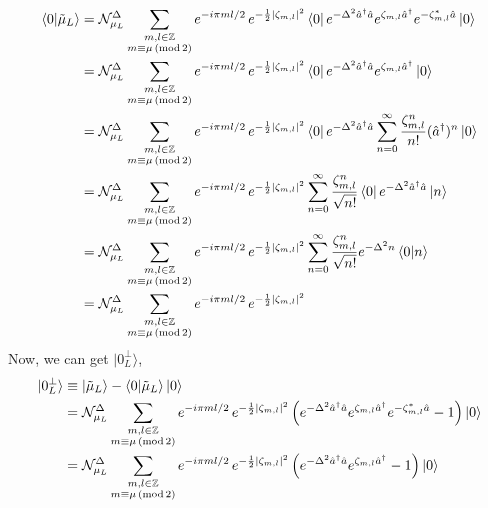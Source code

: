\documentclass[11pt]{article}
\begin{document}
\begin{align*}
    \braket{0}{\tilde{\mu}_L} & = \mathcal{N}_{\mu_L}^{\Delta} \sum_{\substack{m, l \in \mathbb{Z} \\ m \equiv \mu \,(\mathrm{mod}\, 2)}} e^{-i \pi m l / 2} \, e^{-\frac{1}{2} \abs{\zeta_{m,l}}^2} \bra{0} e^{-\Delta^2 \hat{a}^\dagger \hat{a}} e^{\zeta_{m,l}\hat{a}^\dagger} e^{- \zeta_{m,l}^* \hat{a}} \ket{0} \\
                              & = \mathcal{N}_{\mu_L}^{\Delta} \sum_{\substack{m, l \in \mathbb{Z} \\ m \equiv \mu \,(\mathrm{mod}\, 2)}} e^{-i \pi m l / 2} \, e^{-\frac{1}{2} \abs{\zeta_{m,l}}^2} \bra{0} e^{-\Delta^2 \hat{a}^\dagger \hat{a}} e^{\zeta_{m,l}\hat{a}^\dagger} \ket{0} \\
                              & = \mathcal{N}_{\mu_L}^{\Delta} \sum_{\substack{m, l \in \mathbb{Z} \\ m \equiv \mu \,(\mathrm{mod}\, 2)}} e^{-i \pi m l / 2} \, e^{-\frac{1}{2} \abs{\zeta_{m,l}}^2} \bra{0} e^{-\Delta^2 \hat{a}^\dagger \hat{a}} \sum_{n=0}^{\infty} \frac{\zeta_{m,l}^n}{n!} (\hat{a}^{\dagger})^n \ket{0} \\
                              & = \mathcal{N}_{\mu_L}^{\Delta} \sum_{\substack{m, l \in \mathbb{Z} \\ m \equiv \mu \,(\mathrm{mod}\, 2)}} e^{-i \pi m l / 2} \, e^{-\frac{1}{2} \abs{\zeta_{m,l}}^2} \sum_{n=0}^{\infty} \frac{\zeta_{m,l}^n}{\sqrt{n!}} \bra{0} e^{-\Delta^2 \hat{a}^\dagger \hat{a}} \ket{n} \\
                              & = \mathcal{N}_{\mu_L}^{\Delta} \sum_{\substack{m, l \in \mathbb{Z} \\ m \equiv \mu \,(\mathrm{mod}\, 2)}} e^{-i \pi m l / 2} \, e^{-\frac{1}{2} \abs{\zeta_{m,l}}^2} \sum_{n=0}^{\infty} \frac{\zeta_{m,l}^n}{\sqrt{n!}} e^{-\Delta^2 n} \braket{0}{n} \\
                              & = \mathcal{N}_{\mu_L}^{\Delta} \sum_{\substack{m, l \in \mathbb{Z} \\ m \equiv \mu \,(\mathrm{mod}\, 2)}} e^{-i \pi m l / 2} \, e^{-\frac{1}{2} \abs{\zeta_{m,l}}^2}
\end{align*}
Now, we can get $|0^{\perp}_L\rangle$,
\begin{align*}
    |0^{\perp}_L\rangle & \equiv \ket{\tilde{\mu}_L} - \braket{0}{\tilde{\mu}_L}\ket{0}      \\
                        & = \mathcal{N}_{\mu_L}^{\Delta} \sum_{\substack{m, l \in \mathbb{Z} \\ m \equiv \mu \,(\mathrm{mod}\, 2)}} e^{-i \pi m l / 2} \, e^{-\frac{1}{2} \abs{\zeta_{m,l}}^2} \left(e^{-\Delta^2 \hat{a}^\dagger \hat{a}} e^{\zeta_{m,l}\hat{a}^\dagger} e^{- \zeta_{m,l}^* \hat{a}} - 1\right) \ket{0} \\
                        & = \mathcal{N}_{\mu_L}^{\Delta} \sum_{\substack{m, l \in \mathbb{Z} \\ m \equiv \mu \,(\mathrm{mod}\, 2)}} e^{-i \pi m l / 2} \, e^{-\frac{1}{2} \abs{\zeta_{m,l}}^2} \left(e^{-\Delta^2 \hat{a}^\dagger \hat{a}} e^{\zeta_{m,l}\hat{a}^\dagger} - 1\right) \ket{0}
\end{align*}
\end{document}
